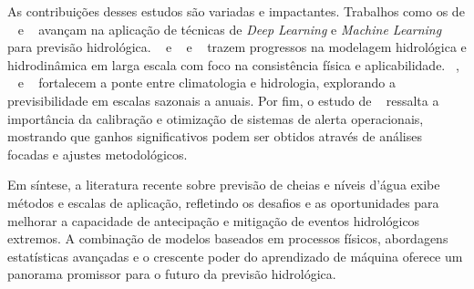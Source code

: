 \documentclass[ 12pt,a4paper ]{article} %
\begin{document}
		As contribuições desses estudos são variadas e impactantes. Trabalhos como os de ~\cite{LIU2023} e ~\cite{Nguyen2015} avançam na aplicação de técnicas de \textit{Deep Learning} e \textit{Machine Learning} para previsão hidrológica. ~\cite{alves2022} e ~\cite{fan2021} e ~\cite{SIQUEIRA2020} trazem progressos na modelagem hidrológica e hidrodinâmica em larga escala com foco na consistência física e aplicabilidade. ~\cite{Gubler2020}, ~\cite{Chevuturi2021} e ~\cite{SCHONGART2007} fortalecem a ponte entre climatologia e hidrologia, explorando a previsibilidade em escalas sazonais a anuais. Por fim, o estudo de ~\cite{Maciel2022} ressalta a importância da calibração e otimização de sistemas de alerta operacionais, mostrando que ganhos significativos podem ser obtidos através de análises focadas e ajustes metodológicos.
		
		Em síntese, a literatura recente sobre previsão de cheias e níveis d'água exibe métodos e escalas de aplicação, refletindo os desafios e as oportunidades para melhorar a capacidade de antecipação e mitigação de eventos hidrológicos extremos. A combinação de modelos baseados em processos físicos, abordagens estatísticas avançadas e o crescente poder do aprendizado de máquina oferece um panorama promissor para o futuro da previsão hidrológica.
		
\end{document}
